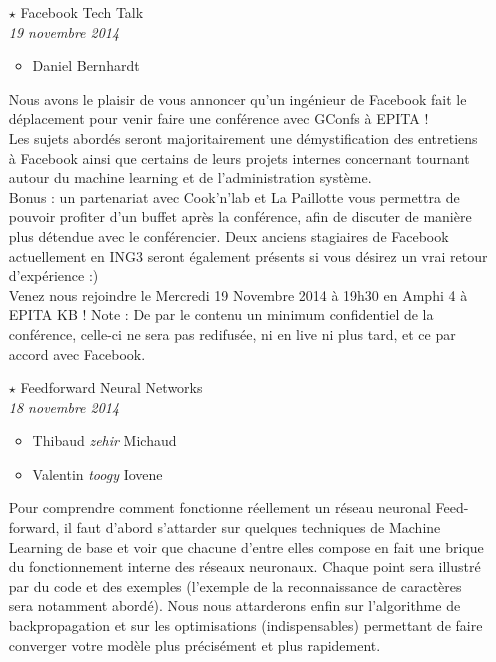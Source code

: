 \documentclass[a4paper]{article}
\begin{document}
\begin{itemize}
        \vspace{0.3cm}

    \item[$\star$] Facebook Tech Talk\\
        \emph{19 novembre 2014}
        \begin{itemize}
            \item Daniel Bernhardt
        \end{itemize}

        Nous avons le plaisir de vous annoncer qu'un ingénieur de Facebook fait
        le déplacement pour venir faire une conférence avec GConfs à EPITA !\\

        Les sujets abordés seront majoritairement une démystification des
        entretiens à Facebook ainsi que certains de leurs projets internes
        concernant tournant autour du machine learning et de l'administration
        système.\\

        Bonus : un partenariat avec Cook'n'lab et La Paillotte vous permettra
        de pouvoir profiter d'un buffet après la conférence, afin de discuter
        de manière plus détendue avec le conférencier. Deux anciens stagiaires
        de Facebook actuellement en ING3 seront également présents si vous
        désirez un vrai retour d'expérience :)\\

        Venez nous rejoindre le Mercredi 19 Novembre 2014 à 19h30 en Amphi 4 à
        EPITA KB ! Note : De par le contenu un minimum confidentiel de la
        conférence, celle-ci ne sera pas redifusée, ni en live ni plus tard, et
        ce par accord avec Facebook.


        \vspace{0.3cm}

    \item[$\star$] Feedforward Neural Networks\\
        \emph{18 novembre 2014}
        \begin{itemize}
            \item Thibaud \emph{zehir} Michaud
            \item Valentin \emph{toogy} Iovene
        \end{itemize}

        Pour comprendre comment fonctionne réellement un réseau neuronal
        Feed-forward, il faut d'abord s'attarder sur quelques techniques de
        Machine Learning de base et voir que chacune d'entre elles compose en
        fait une brique du fonctionnement interne des réseaux neuronaux. Chaque
        point sera illustré par du code et des exemples (l'exemple de la
        reconnaissance de caractères sera notamment abordé). Nous nous
        attarderons enfin sur l'algorithme de backpropagation et sur les
        optimisations (indispensables) permettant de faire converger votre
        modèle plus précisément et plus rapidement.


\end{itemize}
\end{document}
